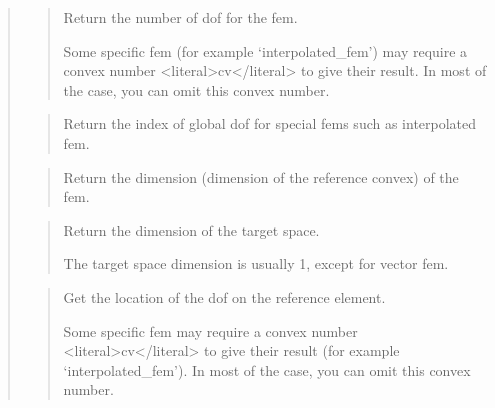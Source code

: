 \documentclass[a4paper,11pt,english]{sphinxmanual}
\begin{document}
\sphinxAtStartPar
{}
\begin{quote}

\sphinxAtStartPar
{}
\begin{quote}

\sphinxAtStartPar
Return the number of dof for the fem.

\sphinxAtStartPar
Some specific fem (for example ‘interpolated\_fem’) may require a
convex number \textless{}literal\textgreater{}cv\textless{}/literal\textgreater{} to give their result. In most of the case, you
can omit this convex number.
\end{quote}

\sphinxAtStartPar
{}
\begin{quote}

\sphinxAtStartPar
Return the index of global dof for special fems such as interpolated fem.
\end{quote}

\sphinxAtStartPar
{}
\begin{quote}

\sphinxAtStartPar
Return the dimension (dimension of the reference convex) of the fem.
\end{quote}

\sphinxAtStartPar
{}
\begin{quote}

\sphinxAtStartPar
Return the dimension of the target space.

\sphinxAtStartPar
The target space dimension is usually 1, except for vector fem.
\end{quote}

\sphinxAtStartPar
{}
\begin{quote}

\sphinxAtStartPar
Get the location of the dof on the reference element.

\sphinxAtStartPar
Some specific fem may require a convex number \textless{}literal\textgreater{}cv\textless{}/literal\textgreater{} to give their
result (for example ‘interpolated\_fem’). In most of the case, you
can omit this convex number.
\end{quote}


\end{quote}
\end{document}
